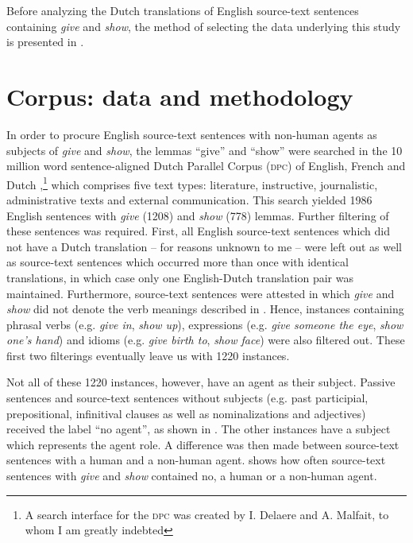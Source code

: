 \documentclass[output=paper]{LSP/langsci}
\begin{document}
Before analyzing the Dutch translations of English source-text sentences containing \textit{give} and \textit{show}, the method of selecting the data underlying this study is presented in .

\section{Corpus: data and methodology} \label{sec:5:5}

In order to procure English source-text sentences with non-human agents as subjects of \textit{give} and \textit{show}, the lemmas “give” and “show” were searched in the 10 million word sentence-aligned Dutch Parallel Corpus (\textsc{dpc}) of English, French and Dutch \citep[see e.g.][]{Rura2008},\footnote{A search interface for the \textsc{dpc} was created by I. Delaere and A. Malfait, to whom I am greatly indebted} which comprises five text types: literature, instructive, journalistic, administrative texts and external communication. This search yielded 1986 English sentences with \textit{give} (1208) and \textit{show} (778) lemmas. Further filtering of these sentences was required. First, all English source-text sentences which did not have a Dutch translation – for reasons unknown to me – were left out as well as source-text sentences which occurred more than once with identical translations, in which case only one English-Dutch translation pair was maintained. Furthermore, source-text sentences were attested in which \textit{give} and \textit{show} did not denote the verb meanings described in . Hence, instances containing phrasal verbs (e.g. \textit{give in}, \textit{show up}), expressions (e.g. \textit{give someone the eye}, \textit{show one’s hand}) and idioms (e.g. \textit{give birth to}, \textit{show face}) were also filtered out. These first two filterings eventually leave us with 1220 instances.

Not all of these 1220 instances, however, have an agent as their subject. Passive sentences and source-text sentences without subjects (e.g. past participial, prepositional, infinitival clauses as well as nominalizations and adjectives) received the label “no agent”, as shown in . The other instances have a subject which represents the agent role. A difference was then made between source-text sentences with a human and a non-human agent.  shows how often source-text sentences with \textit{give} and \textit{show} contained no, a human or a non-human agent.     
\end{document}
